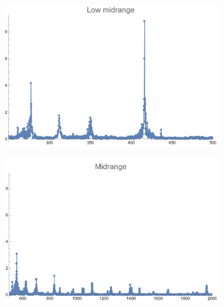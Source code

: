 \documentclass[12pt, letterpaper]{article}
\begin{document}
\begin{figure}[H]
  \centering
  \begin{minipage}{.5\textwidth}
    \centering
    \includegraphics[width=.9\linewidth]{imgs/Cancion8/lowmid.png}
    \label{fig:08d}
  \end{minipage}%
  \begin{minipage}{.5\textwidth}
    \centering
    \includegraphics[width=.9\linewidth]{imgs/Cancion8/mid.png}
    \label{fig:08e}
  \end{minipage}
\end{figure}
\end{document}
